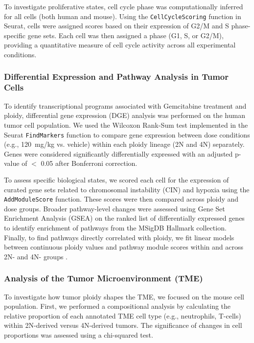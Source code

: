\documentclass[11pt,notitlepage]{article}
\begin{document}
To investigate proliferative states, cell cycle phase was computationally inferred for all cells (both human and mouse). Using the \texttt{CellCycleScoring} function in Seurat, cells were assigned scores based on their expression of G2/M and S phase-specific gene sets. Each cell was then assigned a phase (G1, S, or G2/M), providing a quantitative measure of cell cycle activity across all experimental conditions.


\subsubsection{Differential Expression and Pathway Analysis in Tumor Cells}
To identify transcriptional programs associated with Gemcitabine treatment and ploidy, differential gene expression (DGE) analysis was performed on the human tumor cell population. We used the Wilcoxon Rank-Sum test implemented in the Seurat \texttt{FindMarkers} function to compare gene expression between dose conditions (e.g., 120~mg/kg vs. vehicle) within each ploidy lineage (2N and 4N) separately. Genes were considered significantly differentially expressed with an adjusted p-value of $<$ 0.05 after Bonferroni correction.

To assess specific biological states, we scored each cell for the expression of curated gene sets related to chromosomal instability (CIN) and hypoxia using the \texttt{AddModuleScore} function. These scores were then compared across ploidy and dose groups. Broader pathway-level changes were assessed using Gene Set Enrichment Analysis (GSEA) on the ranked list of differentially expressed genes to identify enrichment of pathways from the MSigDB Hallmark collection. Finally, to find pathways directly correlated with ploidy, we fit linear models between continuous ploidy values and pathway module scores \color{blue} within and across 2N- and 4N- groups \color{black}.

\subsubsection{Analysis of the Tumor Microenvironment (TME)}
To investigate how tumor ploidy shapes the TME, we focused on the mouse cell population. First, we performed a compositional analysis by calculating the relative proportion of each annotated TME cell type (e.g., neutrophils, T-cells) within 2N-derived versus 4N-derived tumors. The significance of changes in cell proportions was assessed using a chi-squared test. 
\end{document}
